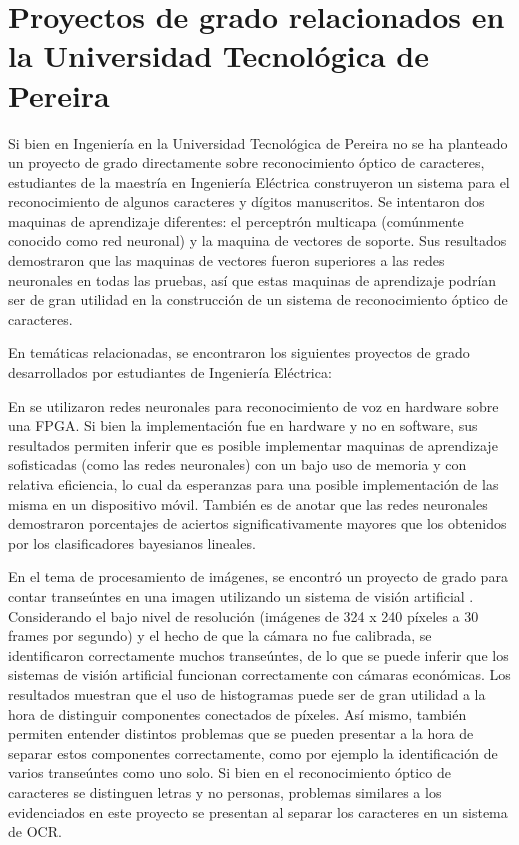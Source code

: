 \documentclass[a4paper, 11pt, oneside]{article}
\begin{document}
	\section{Proyectos de grado relacionados en la Universidad Tecnológica de Pereira}
	Si bien en Ingeniería en la Universidad Tecnológica de Pereira no se ha planteado un proyecto 
        de grado directamente sobre reconocimiento óptico de caracteres, estudiantes de la maestría en
        Ingeniería Eléctrica \cite{th2} construyeron un sistema para el reconocimiento de algunos caracteres 
        y dígitos manuscritos. Se intentaron dos maquinas de aprendizaje diferentes:
	el perceptrón multicapa (comúnmente conocido como red neuronal) y la maquina de vectores de
	soporte. Sus resultados demostraron que las maquinas de vectores fueron superiores a las redes
        neuronales en todas las pruebas, así que estas maquinas de aprendizaje podrían ser de gran 
        utilidad en la construcción de un sistema de reconocimiento óptico de caracteres.\newline

	En temáticas relacionadas, se encontraron los siguientes proyectos de grado desarrollados por 
        estudiantes de Ingeniería Eléctrica:\newline 

        En \cite{th3} se utilizaron redes neuronales para reconocimiento de voz en hardware sobre una FPGA. 
        Si bien la implementación fue en hardware y no en software, sus resultados permiten inferir que es 
        posible implementar maquinas de aprendizaje sofisticadas (como las redes neuronales) con un bajo uso
        de memoria y con relativa eficiencia, lo cual da esperanzas para una posible implementación de las 
        misma en un dispositivo móvil. También es de anotar que las redes neuronales demostraron porcentajes 
        de aciertos significativamente mayores que los obtenidos por los clasificadores bayesianos lineales.
	\newline

	En el tema de procesamiento de imágenes, se encontró un proyecto de grado para contar transeúntes en
        una imagen utilizando un sistema de visión artificial \cite{th4}. Considerando el bajo nivel de
	resolución (imágenes de 324 x 240 píxeles a 30 frames por segundo) y el hecho de que la cámara no
	fue calibrada, se identificaron correctamente muchos transeúntes, de lo que se puede inferir que los 
        sistemas de visión artificial funcionan correctamente con cámaras económicas. Los resultados muestran que
	el uso de histogramas puede ser de gran utilidad a la hora de distinguir componentes conectados de 
        píxeles. Así mismo, también permiten entender distintos problemas que se pueden presentar a la hora de
        separar estos componentes correctamente, como por ejemplo la identificación de varios transeúntes como 
        uno solo. Si bien en el reconocimiento óptico de caracteres se distinguen letras y no personas, problemas 
        similares a los evidenciados en este proyecto se presentan al separar los caracteres en un sistema de 
	OCR.\newline
	
\end{document}
